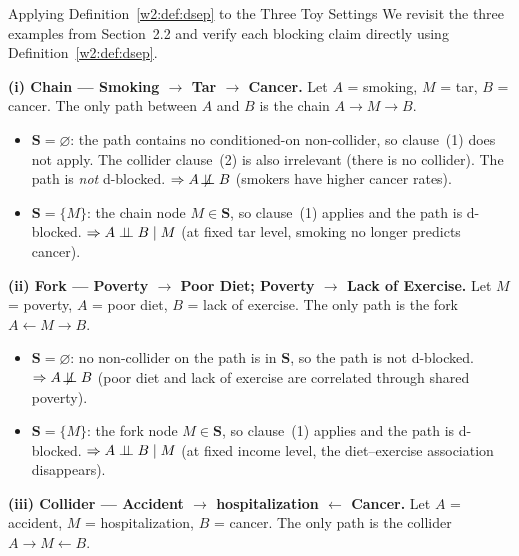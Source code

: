 \documentclass[master.tex]{subfiles}
\begin{document}
\begin{example}{Applying Definition~\ref{w2:def:dsep} to the Three Toy Settings}
\label{w2:ex:threesettings}
We revisit the three examples from Section~2.2 and verify each blocking
claim directly using Definition~\ref{w2:def:dsep}.

\medskip
\noindent\textbf{(i) Chain --- Smoking $\to$ Tar $\to$ Cancer.}
Let $A$ = smoking, $M$ = tar, $B$ = cancer.
The only path between $A$ and $B$ is the chain $A \to M \to B$.

\begin{itemize}
  \item $\mathbf{S} = \varnothing$: the path contains no conditioned-on
        non-collider, so clause~(1) does not apply.
        The collider clause~(2) is also irrelevant (there is no collider).
        The path is \emph{not} d-blocked.
        $\Rightarrow A \not\!\perp\!\!\!\perp B$ (smokers have higher cancer rates).
  \item $\mathbf{S} = \{M\}$: the chain node $M \in \mathbf{S}$,
        so clause~(1) applies and the path is d-blocked.
        $\Rightarrow A \perp\!\!\!\perp B \mid M$ (at fixed tar level,
        smoking no longer predicts cancer).
\end{itemize}

\medskip
\noindent\textbf{(ii) Fork --- Poverty $\to$ Poor Diet; Poverty $\to$ Lack of Exercise.}
Let $M$ = poverty, $A$ = poor diet, $B$ = lack of exercise.
The only path is the fork $A \leftarrow M \to B$.

\begin{itemize}
  \item $\mathbf{S} = \varnothing$: no non-collider on the path is in
        $\mathbf{S}$, so the path is not d-blocked.
        $\Rightarrow A \not\!\perp\!\!\!\perp B$ (poor diet and lack of
        exercise are correlated through shared poverty).
  \item $\mathbf{S} = \{M\}$: the fork node $M \in \mathbf{S}$, so
        clause~(1) applies and the path is d-blocked.
        $\Rightarrow A \perp\!\!\!\perp B \mid M$ (at fixed income level,
        the diet--exercise association disappears).
\end{itemize}

\medskip
\noindent\textbf{(iii) Collider --- Accident $\to$ hospitalization $\leftarrow$ Cancer.}
Let $A$ = accident, $M$ = hospitalization, $B$ = cancer.
The only path is the collider $A \to M \leftarrow B$.


\end{example}
\end{document}
